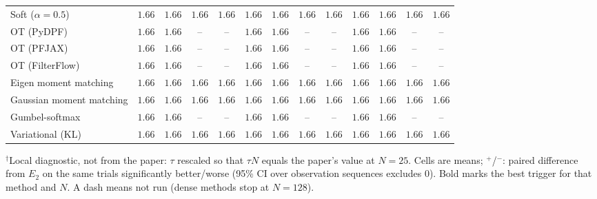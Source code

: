 \begin{table}[ht]
\begin{adjustbox}{max width=\linewidth}
\begin{tabular}{lcccc|cccc|cccc}
Soft ($\alpha{=}0.5$) & $\mathbf{1.66}$ & $1.66$ & $1.66$ & $\mathbf{1.66}$ & $1.66$ & $1.66$ & $\mathbf{1.66}$ & $1.66$ & $\mathbf{1.66}$ & $\mathbf{1.66}$ & $1.66$ & $1.66$ \\
OT (PyDPF) & $\mathbf{1.66}$ & $1.66$ & -- & -- & $1.66$ & $\mathbf{1.66}$ & -- & -- & $1.66$ & $1.66$ & -- & -- \\
OT (PFJAX) & $\mathbf{1.66}$ & $1.66$ & -- & -- & $1.66$ & $\mathbf{1.66}$ & -- & -- & $1.66$ & $1.66$ & -- & -- \\
OT (FilterFlow) & $\mathbf{1.66}$ & $1.66$ & -- & -- & $1.66$ & $\mathbf{1.66}$ & -- & -- & $1.66$ & $1.66$ & -- & -- \\
Eigen moment matching & $1.66$ & $1.66$ & $\mathbf{1.66}$ & $\mathbf{1.66}$ & $1.66$ & $1.66$ & $\mathbf{1.66}$ & $1.66$ & $\mathbf{1.66}$ & $\mathbf{1.66}$ & $1.66$ & $1.66$ \\
Gaussian moment matching & $\mathbf{1.66}$ & $1.66$ & $1.66$ & $1.66$ & $1.66$ & $\mathbf{1.66}$ & $\mathbf{1.66}$ & $\mathbf{1.66}$ & $1.66$ & $1.66$ & $1.66$ & $1.66$ \\
Gumbel-softmax & $\mathbf{1.66}$ & $1.66$ & -- & -- & $1.66$ & $\mathbf{1.66}$ & -- & -- & $1.66$ & $1.66$ & -- & -- \\
Variational (KL) & $1.66$ & $1.66$ & $\mathbf{1.66}$ & $1.66$ & $\mathbf{1.66}$ & $1.66$ & $1.66$ & $1.66$ & $1.66$ & $\mathbf{1.66}$ & $1.66$ & $\mathbf{1.66}$ \\
\bottomrule
\end{tabular}
\end{adjustbox}
\par\smallskip\parbox{0.95\linewidth}{\footnotesize $^\dagger$Local diagnostic, not from the paper: $\tau$ rescaled so that $\tau N$ equals the paper's value at $N{=}25$. Cells are means; $^{+}$/$^{-}$: paired difference from $E_2$ on the same trials significantly better/worse (95\% CI over observation sequences excludes 0). Bold marks the best trigger for that method and $N$. A dash means not run (dense methods stop at $N{=}128$).}
\end{table}

